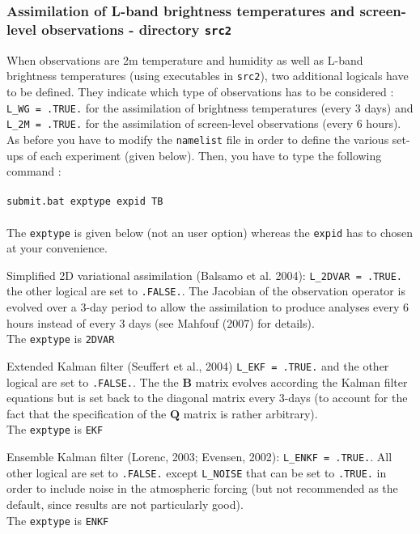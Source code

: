 \documentclass[12pt]{article}
\begin{document}
\subsubsection{Assimilation of L-band brightness temperatures and screen-level 
observations - directory {\tt src2}}
When observations are 2m temperature and humidity
as well as L-band brightness temperatures (using executables in {\tt src2}),
two additional logicals have to be defined. They indicate which type of observations has to 
be considered : {\tt L\_WG = .TRUE.} for the assimilation of brightness temperatures
(every 3 days)
and {\tt L\_2M = .TRUE.} for the 
assimilation of screen-level observations (every 6 hours).
As before you have to modify the {\tt namelist} file in order to define the
various set-ups of each experiment (given below). Then, you have to type the
following command :
\\
\\
{\tt submit.bat exptype expid  TB}
\\
\\
The {\tt exptype} is given below (not an user option) whereas the {\tt expid}
has to chosen at your convenience.
\begin{description}
\item {\sc Simplified 2D variational assimilation} (Balsamo et al. 2004):
{\tt L\_2DVAR = .TRUE.} the other logical are set to  {\tt .FALSE.}.
The Jacobian of the observation operator is evolved over a 3-day period
to allow the assimilation to produce analyses every 6 hours instead of every 3 days
(see Mahfouf (2007) for details). \\
The {\tt exptype} is {\tt 2DVAR}
\item {\sc Extended Kalman filter} (Seuffert et al., 2004)
{\tt L\_EKF = .TRUE.} and the other logical are set to  {\tt .FALSE.}. The
the $\mathbf{B}$ matrix evolves according the Kalman filter equations but
is set back to the diagonal matrix every 3-days (to account for the
fact that the specification of the $\mathbf{Q}$ matrix is rather arbitrary).  
\\
The {\tt exptype} is {\tt  EKF}
\item {\sc Ensemble Kalman filter} (Lorenc, 2003; Evensen, 2002):
{\tt L\_ENKF = .TRUE.}. All other logical are set to {\tt .FALSE.}
except {\tt L\_NOISE} that can be set to {\tt .TRUE.} in order
to include noise in the atmospheric forcing (but not recommended as
the default, since results are not particularly good).
\\
The {\tt exptype} is {\tt ENKF}
\end{description}
\end{document}
